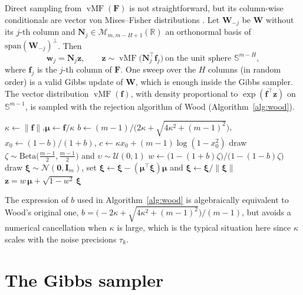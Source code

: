 \documentclass[11pt]{article}
\DeclareMathOperator{\vMF}{vMF}
\newcommand{\F}{\mathbf{F}}
\newcommand{\W}{\mathbf{W}}
\newcommand{\ww}{\mathbf{w}}
\newcommand{\f}{\mathbf{f}}
\newcommand{\z}{\mathbf{z}}
\newcommand{\I}{\mathbf{I}}
\begin{document}
Direct sampling from $\vMF(\F)$ is not straightforward, but its column-wise conditionals are vector von
Mises--Fisher distributions \cite{hoff2009}. Let $\W_{-j}$ be $\W$ without its $j$-th column and
$\mathbf N_j\in\mathcal M_{m,m-H+1}(\mathbb R)$ an orthonormal basis of $\mathrm{span}(\W_{-j})^\perp$. Then
\[
  \ww_j=\mathbf N_j\z,\qquad \z\sim\vMF\bigl(\mathbf N_j^\intercal\f_j\bigr)\ \text{on the unit sphere } \mathbb S^{m-H},
\]
where $\f_j$ is the $j$-th column of $\F$. One sweep over the $H$ columns (in random order) is a valid Gibbs update
of $\W$, which is enough inside the Gibbs sampler. The vector distribution $\vMF(\f)$, with density
proportional to $\exp(\f^\intercal\z)$ on $\mathbb S^{m-1}$, is sampled with the rejection algorithm of Wood \cite{wood1994}
(Algorithm~\ref{alg:wood}).

\begin{algorithm}[ht]
\caption{Sampling $\z\sim\vMF(\f)$ on $\mathbb S^{m-1}$ (Wood, 1994)}\label{alg:wood}
\begin{algorithmic}[1]
  \State $\kappa\gets\|\f\|$,\quad $\boldsymbol\mu\gets\f/\kappa$
  \State $b\gets (m-1)\big/\bigl(2\kappa+\sqrt{4\kappa^2+(m-1)^2}\bigr)$,\quad $x_0\gets(1-b)/(1+b)$,\quad
         $c\gets\kappa x_0+(m-1)\log(1-x_0^2)$
  \Repeat
     \State draw $\zeta\sim\mathrm{Beta}\bigl(\tfrac{m-1}{2},\tfrac{m-1}{2}\bigr)$ and $\upsilon\sim\mathcal U(0,1)$
     \State $w\gets\bigl(1-(1+b)\zeta\bigr)\big/\bigl(1-(1-b)\zeta\bigr)$
  \State draw $\boldsymbol\xi\sim\mathcal N(\mathbf 0,\I_m)$, set $\boldsymbol\xi\gets\boldsymbol\xi-(\boldsymbol\mu^\intercal\boldsymbol\xi)\boldsymbol\mu$
         and $\boldsymbol\xi\gets\boldsymbol\xi/\|\boldsymbol\xi\|$
  \State \Return $\z=w\,\boldsymbol\mu+\sqrt{1-w^2}\,\boldsymbol\xi$
\end{algorithmic}
\end{algorithm}

\noindent The expression of $b$ used in Algorithm~\ref{alg:wood} is algebraically equivalent to Wood's original one,
$b=\bigl(-2\kappa+\sqrt{4\kappa^2+(m-1)^2}\bigr)/(m-1)$, but avoids a numerical cancellation when $\kappa$ is large,
which is the typical situation here since $\kappa$ scales with the noise precisions $\tau_k$.

\section{The Gibbs sampler}
\end{document}
